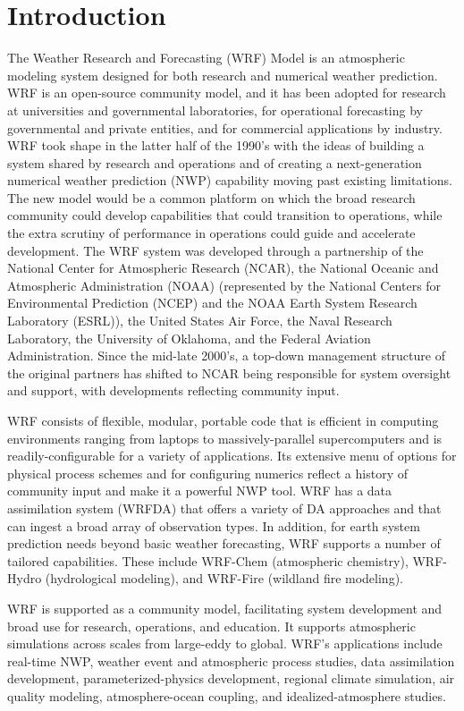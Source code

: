 \chapter{Introduction}
\label{introduction_chap}
The Weather Research and Forecasting (WRF) Model is
an atmospheric modeling system designed for both research and numerical 
weather prediction.  WRF is an open-source community model, and it has been 
adopted for research at universities and governmental laboratories, 
for operational forecasting by governmental and private entities,
and for commercial applications by industry.  WRF took shape in the latter 
half of the 1990's with the ideas of building a system shared by research 
and operations and of creating a next-generation numerical weather 
prediction (NWP) capability moving 
past existing limitations.  The new model would be a 
common platform on which the broad research community 
could develop capabilities that could transition to operations, 
while the extra scrutiny of performance in operations
could guide and accelerate development.  The WRF system was developed
through a partnership of the National 
Center for Atmospheric Research (NCAR), the National Oceanic and Atmospheric 
Administration (NOAA) (represented by the National Centers for Environmental 
Prediction (NCEP) and the NOAA Earth System Research Laboratory (ESRL)), 
the United States Air Force, the Naval Research Laboratory, the 
University of Oklahoma, and the Federal Aviation Administration.  
Since the mid-late 2000's, a top-down management structure 
of the original partners has shifted to NCAR being responsible for system 
oversight and support, with developments reflecting community input. 

WRF consists of flexible, modular, portable code that is 
efficient in computing environments ranging from laptops to 
massively-parallel supercomputers and is readily-configurable for 
a variety of applications.  Its extensive menu of options 
for physical process schemes and for configuring numerics  
reflect a history of community input
and make it a powerful NWP tool.  WRF has a 
data assimilation system (WRFDA)
that offers a variety of DA approaches and that can ingest a 
broad array of observation types.  In addition, for earth system prediction needs 
beyond basic weather forecasting, WRF supports a number of tailored capabilities.  
These include WRF-Chem (atmospheric chemistry), 
WRF-Hydro (hydrological modeling), and WRF-Fire (wildland fire modeling).

WRF is supported as a community model, facilitating system development
and broad use for research, operations, and education.  It supports  
atmospheric simulations across scales from large-eddy to global.  
WRF's applications include real-time NWP, weather event and 
atmospheric process studies, data assimilation development, 
parameterized-physics development, regional climate simulation, air 
quality modeling, atmosphere-ocean coupling, and idealized-atmosphere studies.  

